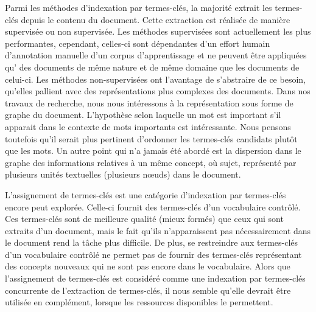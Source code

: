     Parmi les méthodes d'indexation par termes-clés, la majorité extrait les
    termes-clés depuis le contenu du document. Cette extraction est réalisée de
    manière supervisée ou non supervisée. Les méthodes supervisées sont
    actuellement les plus performantes, cependant, celles-ci sont dépendantes
    d'un effort humain d'annotation manuelle d'un corpus d'apprentissage et ne
    peuvent être appliquées qu' des documents de même nature et de même domaine
    que les documents de celui-ci. Les méthodes non-supervisées ont l'avantage
    de s'abstraire de ce besoin, qu'elles pallient avec des représentations plus
    complexes des documents. Dans nos travaux de recherche, nous nous
    intéressons à la représentation sous forme de graphe du document.
    L'hypothèse selon laquelle un mot est important s'il apparait dans le
    contexte de mots importants est intéressante. Nous pensons toutefois qu'il
    serait plus pertinent d'ordonner les termes-clés candidats plutôt que les
    mots. Un autre point qui n'a jamais été abordé est la dispersion dans le
    graphe des informations relatives à un même concept, où sujet, représenté
    par plusieurs unités textuelles (plusieurs n\oe{}uds) dans le document.

    L'assignement de termes-clés est une catégorie d'indexation par termes-clés
    encore peut explorée. Celle-ci fournit des termes-clés d'un vocabulaire
    contrôlé. Ces termes-clés sont de meilleure qualité (mieux formés) que ceux
    qui sont extraits d'un document, mais le fait qu'ils n'apparaissent pas
    nécessairement dans le document rend la tâche plus difficile. De plus, se
    restreindre aux termes-clés d'un vocabulaire contrôlé ne permet pas de
    fournir des termes-clés représentant des concepts nouveaux qui ne sont pas
    encore dans le vocabulaire. Alors que l'assignement de termes-clés est
    considéré comme une indexation par termes-clés concurrente de l'extraction
    de termes-clés, il nous semble qu'elle devrait être utilisée en complément,
    lorsque les ressources disponibles le permettent.

